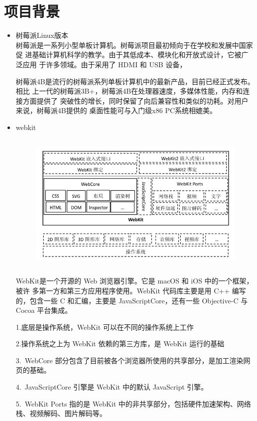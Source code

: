 \documentclass[UTF8,14pt]{article}
\numberwithin{figure}{section}
\begin{document}
\section{项目背景}
\begin{itemize}
	\item 树莓派Linux版本\\
	      树莓派是一系列小型单板计算机。树莓派项目最初倾向于在学校和发展中国家促
	      进基础计算机科学的教学。由于其低成本、模块化和开放式设计，它被广泛应用
	      于许多领域。由于采用了 HDMI 和 USB 设备，

	      树莓派4B是流行的树莓派系列单板计算机中的最新产品，目前已经正式发布。相比
	      上一代的树莓派3B+，树莓派4B在处理器速度，多媒体性能，内存和连接方面提供了
	      突破性的增长，同时保留了向后兼容性和类似的功耗。对用户来说，树莓派4B提供的
	      桌面性能可与入门级x86 PC系统相媲美。
	\item webkit
	      \begin{figure}[ht]
		      \centering
		      \includegraphics[width=12.00cm,height=6.78cm]{2.png}
	      \end{figure}

	      WebKit是一个开源的 Web 浏览器引擎。它是 macOS 和 iOS 中的一个框架，被许
	      多第一方和第三方应用程序使用。WebKit 代码库主要是用 C++ 编写的，包含一些 C
	      和汇编，主要是 JavaScriptCore，还有一些 Objective-C 与 Cocoa 平台集成。

	      1.底层是操作系统，WebKit 可以在不同的操作系统上工作

	      2.操作系统之上为 WebKit 依赖的第三方库，是 WebKit 运行的基础

	      3.\ WebCore 部分包含了目前被各个浏览器所使用的共享部分，是加工渲染网页的基础。

	      4.\ JavaScriptCore 引擎是 WebKit 中的默认 JavaScript 引擎。

	      5.\ WebKit Ports 指的是 WebKit 中的非共享部分，包括硬件加速架构、网络栈、视频解码、图片解码等。


\end{itemize}
\end{document}
